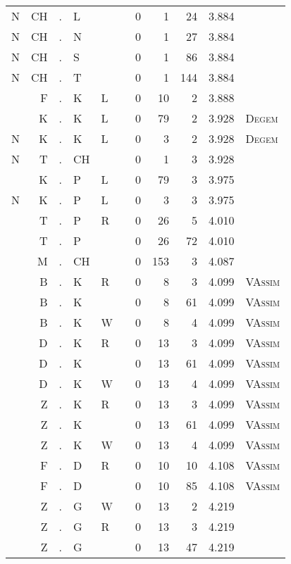 \begin{longtable}{r@{ } r@{ } c@{ } l@{ } l@{ } l@{ } r r r r l }
N & CH & . & L &   &   & 0 & 1 & 24 & 3.884 &  \\
N & CH & . & N &   &   & 0 & 1 & 27 & 3.884 &  \\
N & CH & . & S &   &   & 0 & 1 & 86 & 3.884 &  \\
N & CH & . & T &   &   & 0 & 1 & 144 & 3.884 &  \\
  & F & . & K & L &   & 0 & 10 & 2 & 3.888 &  \\
  & K & . & K & L &   & 0 & 79 & 2 & 3.928 & \textsc{Degem} \\
N & K & . & K & L &   & 0 & 3 & 2 & 3.928 & \textsc{Degem} \\
N & T & . & CH &   &   & 0 & 1 & 3 & 3.928 &  \\
  & K & . & P & L &   & 0 & 79 & 3 & 3.975 &  \\
N & K & . & P & L &   & 0 & 3 & 3 & 3.975 &  \\
  & T & . & P & R &   & 0 & 26 & 5 & 4.010 &  \\
  & T & . & P &   &   & 0 & 26 & 72 & 4.010 &  \\
  & M & . & CH &   &   & 0 & 153 & 3 & 4.087 &  \\
  & B & . & K & R &   & 0 & 8 & 3 & 4.099 & \textsc{VAssim} \\
  & B & . & K &   &   & 0 & 8 & 61 & 4.099 & \textsc{VAssim} \\
  & B & . & K & W &   & 0 & 8 & 4 & 4.099 & \textsc{VAssim} \\
  & D & . & K & R &   & 0 & 13 & 3 & 4.099 & \textsc{VAssim} \\
  & D & . & K &   &   & 0 & 13 & 61 & 4.099 & \textsc{VAssim} \\
  & D & . & K & W &   & 0 & 13 & 4 & 4.099 & \textsc{VAssim} \\
  & Z & . & K & R &   & 0 & 13 & 3 & 4.099 & \textsc{VAssim} \\
  & Z & . & K &   &   & 0 & 13 & 61 & 4.099 & \textsc{VAssim} \\
  & Z & . & K & W &   & 0 & 13 & 4 & 4.099 & \textsc{VAssim} \\
  & F & . & D & R &   & 0 & 10 & 10 & 4.108 & \textsc{VAssim} \\
  & F & . & D &   &   & 0 & 10 & 85 & 4.108 & \textsc{VAssim} \\
  & Z & . & G & W &   & 0 & 13 & 2 & 4.219 &  \\
  & Z & . & G & R &   & 0 & 13 & 3 & 4.219 &  \\
  & Z & . & G &   &   & 0 & 13 & 47 & 4.219 &  \\

\end{longtable}
